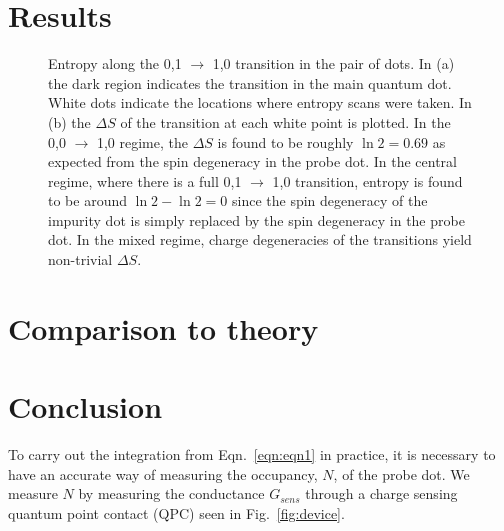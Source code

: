 \section{Results}
\label{sec:results}

\begin{figure}[h]
\centering
{}
\caption{Entropy along the 0,1 $\to$ 1,0 transition in the pair of dots. In (a) the dark region indicates the transition in the main quantum dot. White dots indicate the locations where entropy scans were taken. In (b) the $\Delta S$ of the transition at each white point is plotted. In the 0,0 $\to$ 1,0 regime, the $\Delta S$ is found to be roughly $\ln 2 = 0.69$ as expected from the spin degeneracy in the probe dot. In the central regime, where there is a full 0,1 $\to$ 1,0 transition, entropy is found to be around $\ln 2 - \ln2 = 0$ since the spin degeneracy of the impurity dot is simply replaced by the spin degeneracy in the probe dot. In the mixed regime, charge degeneracies of the transitions yield non-trivial $\Delta S$.}

\label{fig:results1}       %
\end{figure}

\section{Comparison to theory}
\label{sec:discussion}

\section{Conclusion}
\label{sec:conclusion}


To carry out the integration from Eqn.~\ref{eqn:eqn1} in practice, it is necessary to have an accurate way of measuring the occupancy, $N$, of the probe dot. We measure $N$ by measuring the conductance $G_{sens}$ through a charge sensing quantum point contact (QPC) seen in Fig.~\ref{fig:device}. 

